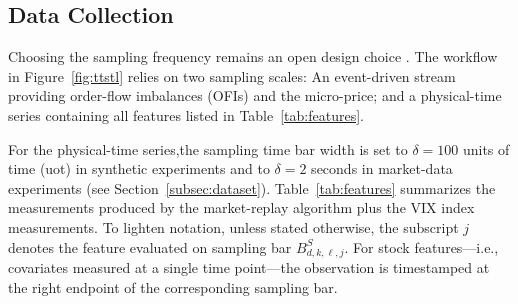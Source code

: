 \documentclass{rQUF2e}
\theoremstyle{plain}
\theoremstyle{definition}
\theoremstyle{remark}
\begin{document}
\subsection{Data Collection}
\label{subsec:data_collection}

Choosing the sampling frequency remains an open design choice \citep{dutta2023review}. The workflow in Figure~\ref{fig:ttstl} relies on two sampling scales: An event-driven stream providing order-flow imbalances (OFIs) and the micro-price; and a physical-time series containing all features listed in Table~\ref{tab:features}.

For the physical-time series,the sampling time bar width is set to $\delta=100$ units of time (uot) in synthetic experiments and to $\delta=2$ seconds in market-data experiments (see Section~\ref{subsec:dataset}). Table~\ref{tab:features} summarizes the measurements produced by the market-replay algorithm plus the VIX index measurements. To lighten notation, unless stated otherwise, the subscript $j$ denotes the feature evaluated on sampling bar $B^{S}_{d,k,\ell,j}$. For stock features—i.e., covariates measured at a single time point—the observation is timestamped at the right endpoint of the corresponding sampling bar.





\end{document}
